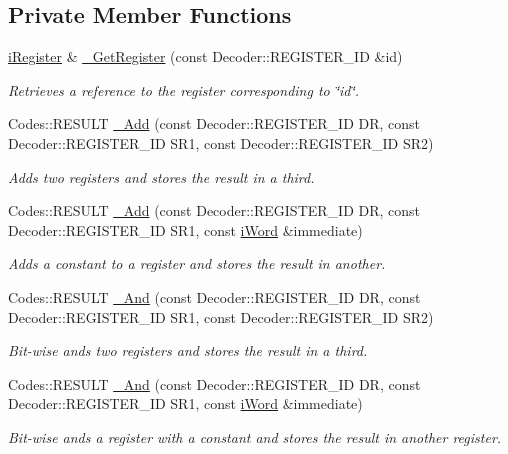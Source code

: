 \subsection*{Private Member Functions}
\begin{DoxyCompactItemize}
\item 
\hyperlink{classiRegister}{iRegister} \& \hyperlink{classWi11_a17b5041499fa55f6b674e4f1ea8ceb59}{\_\-GetRegister} (const Decoder::REGISTER\_\-ID \&id)
\begin{DoxyCompactList}\small\item\em Retrieves a reference to the register corresponding to \char`\"{}id\char`\"{}. \item\end{DoxyCompactList}\item 
Codes::RESULT \hyperlink{classWi11_a818de966479e749f8592e73b35f5e2f2}{\_\-Add} (const Decoder::REGISTER\_\-ID DR, const Decoder::REGISTER\_\-ID SR1, const Decoder::REGISTER\_\-ID SR2)
\begin{DoxyCompactList}\small\item\em Adds two registers and stores the result in a third. \item\end{DoxyCompactList}\item 
Codes::RESULT \hyperlink{classWi11_ae3b47b19ae611cd4788891a812cc7ba0}{\_\-Add} (const Decoder::REGISTER\_\-ID DR, const Decoder::REGISTER\_\-ID SR1, const \hyperlink{classiWord}{iWord} \&immediate)
\begin{DoxyCompactList}\small\item\em Adds a constant to a register and stores the result in another. \item\end{DoxyCompactList}\item 
Codes::RESULT \hyperlink{classWi11_af1e68e7a15deeb829f1771855e108bc0}{\_\-And} (const Decoder::REGISTER\_\-ID DR, const Decoder::REGISTER\_\-ID SR1, const Decoder::REGISTER\_\-ID SR2)
\begin{DoxyCompactList}\small\item\em Bit-\/wise ands two registers and stores the result in a third. \item\end{DoxyCompactList}\item 
Codes::RESULT \hyperlink{classWi11_abb98c230c0e384e4d3a3b9f0e3606db4}{\_\-And} (const Decoder::REGISTER\_\-ID DR, const Decoder::REGISTER\_\-ID SR1, const \hyperlink{classiWord}{iWord} \&immediate)
\begin{DoxyCompactList}\small\item\em Bit-\/wise ands a register with a constant and stores the result in another register. \item\end{DoxyCompactList}\item 

\end{DoxyCompactItemize}
